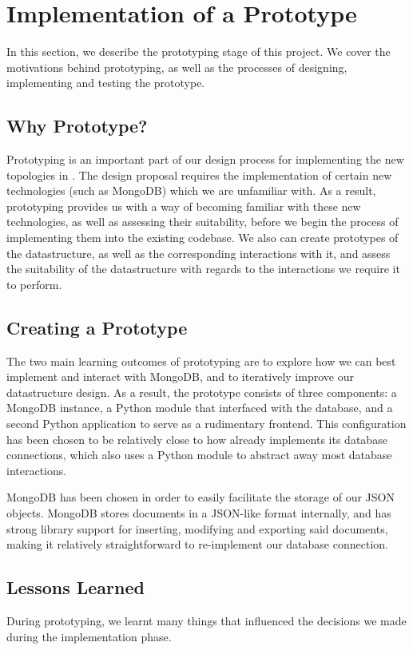 \documentclass[11pt]{article}
\begin{document}
\section{Implementation of a Prototype} \label{sec:implementation}
	In this section, we describe the prototyping stage of this project.
	We cover the motivations behind prototyping, as well as the processes of designing, implementing and testing the prototype.
	\subsection{Why Prototype?}
		Prototyping is an important part of our design process for implementing the new topologies in \opendc{}.
		The design proposal requires the implementation of certain new technologies (such as MongoDB) which we are unfamiliar with.
		As a result, prototyping provides us with a way of becoming familiar with these new technologies, as well as assessing their suitability, before we begin the process of implementing them into the existing \opendc{} codebase.
		We also can create prototypes of the datastructure, as well as the corresponding interactions with it, and assess the suitability of the datastructure with regards to the interactions we require it to perform.
	
	\subsection{Creating a Prototype}
		The two main learning outcomes of prototyping are to explore how we can best implement and interact with MongoDB, and to iteratively improve our datastructure design.
		As a result, the prototype consists of three components: a MongoDB instance, a Python module that interfaced with the database, and a second Python application to serve as a rudimentary frontend. 
		This configuration has been chosen to be relatively close to how \opendc{} already implements its database connections, which also uses a Python module to abstract away most database interactions.

		MongoDB has been chosen in order to easily facilitate the storage of our JSON objects.
		MongoDB stores documents in a JSON-like format internally, and has strong library support for inserting, modifying and exporting said documents, making it relatively straightforward to re-implement our database connection.

	\subsection{Lessons Learned}
		During prototyping, we learnt many things that influenced the decisions we made during the implementation phase.
\end{document}
